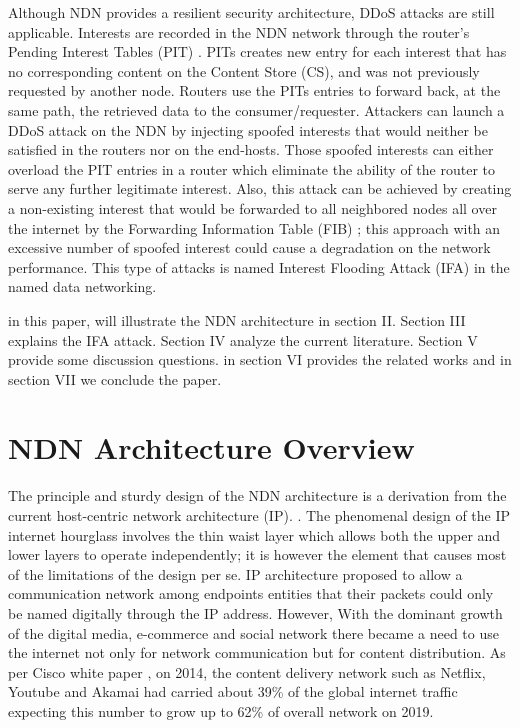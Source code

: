 \documentclass[conference]{IEEEtran}
\begin{document}
Although NDN provides a resilient security architecture, DDoS attacks are still applicable. Interests are recorded in the NDN network through the router's Pending Interest Tables (PIT) \cite{Cheng2012}. PITs creates new entry for each interest that has no corresponding content on the Content Store (CS), and was not previously requested by another node. Routers use the PITs entries to forward back, at the same path, the retrieved data to the consumer/requester. Attackers can launch a DDoS attack on the NDN by injecting spoofed interests that would neither be satisfied in the routers nor on the end-hosts. Those spoofed interests can either overload the PIT entries in a router which eliminate the ability of the router to serve any further legitimate interest. Also, this attack can be achieved by creating a non-existing interest that would be forwarded to all neighbored nodes all over the internet by the Forwarding Information Table (FIB) \cite{Xin2016ANI}; this approach with an excessive number of spoofed interest could cause a degradation on the network performance. This type of attacks is named Interest Flooding Attack (IFA) in the named data networking. 

in this paper, will illustrate the NDN architecture in section II. Section III explains the IFA attack. Section IV analyze the current literature. Section V provide some discussion questions. in section VI provides the related works and in section VII we conclude the paper.   


\section{NDN Architecture Overview}
The principle and sturdy design of the NDN architecture is a derivation from the current host-centric network architecture (IP). \cite{Pan2011}. The phenomenal design of the IP internet hourglass involves the thin waist layer which allows both the upper and lower layers to operate independently; it is however the element that causes most of the limitations of the design per se. IP architecture proposed to allow a communication network among endpoints entities that their packets could only be named digitally through the IP address. However, With the dominant growth of the digital media, e-commerce and social network there became a need to use the internet not only for network communication but for content distribution. As per Cisco white paper \cite{Cisco2015}, on 2014, the content delivery network such as Netflix, Youtube and Akamai had carried about 39\% of the global internet traffic expecting this number to grow up to 62\% of overall network on 2019.
\end{document}
